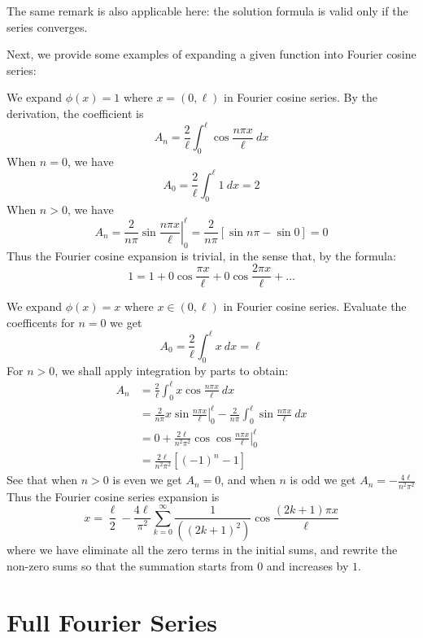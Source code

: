 The same remark is also applicable here: the solution formula is valid only if the series converges.

Next, we provide some examples of expanding a given function into Fourier cosine series:

\medskip 

\begin{ex}
    We expand $\phi(x)=1$ where $x=(0,\ell)$ in Fourier cosine series. By the derivation, the coefficient is 
    \[A_n = \frac{2}{\ell} \int_0^\ell \cos\frac{n\pi x}{\ell}\ dx\]
    When $n=0$, we have 
    \[A_0 = \frac{2}{\ell}\int_0^\ell 1\ dx = 2\]
    When $n>0$, we have 
    \[A_n = \frac{2}{n\pi}\left . \sin\frac{n\pi x}{\ell} \right \vert_0^\ell = \frac{2}{n\pi} [\sin n\pi - \sin 0] = 0\]
    Thus the Fourier cosine expansion is trivial, in the sense that, by the formula:
    \[1 = 1 + 0 \cos \frac{\pi x}{\ell} + 0 \cos\frac{2\pi x}{\ell} + \dots\]
\end{ex}

\begin{ex}
    We expand $\phi(x)=x$ where $x\in(0,\ell)$ in Fourier cosine series. Evaluate the coefficents for $n=0$ we get 
    \[A_0 = \frac{2}{\ell} \int_0^\ell x\ dx = \ell\]
    For $n>0$, we shall apply integration by parts to obtain:
    \begin{align*}
        A_n &= \frac{2}{\ell}\int_0^\ell x \cos \frac{n\pi x}{\ell}\ dx \\
        &= \frac{2}{n\pi} x \sin\left .\frac{n\pi x}{\ell}\right \vert_0^\ell - \frac{2}{n\pi}\int_0^\ell \sin\frac{n\pi x}{\ell}\ dx\\
        &= 0 + \frac{2\ell}{n^2\pi^2} \cos\left . \cos \frac{n\pi x}{\ell}\right \vert^\ell_0\\
        &= \frac{2\ell}{n^2 \pi^2} [(-1)^n-1]
    \end{align*}
    See that when $n>0$ is even we get $A_n = 0$, and when $n$ is odd we get $A_n = -\frac{4\ell}{n^2\pi^2}$
    Thus the Fourier cosine series expansion is 
    \[x = \frac{\ell}{2} - \frac{4\ell}{\pi^2} \sum_{k=0}^\infty \frac{1}{((2k+1)^2)}\cos \frac{(2k+1)\pi x}{\ell} \]
    where we have eliminate all the zero terms in the initial sums, and rewrite the non-zero sums so that the summation starts from $0$ and increases by $1$.
\end{ex}

\section{Full Fourier Series}

